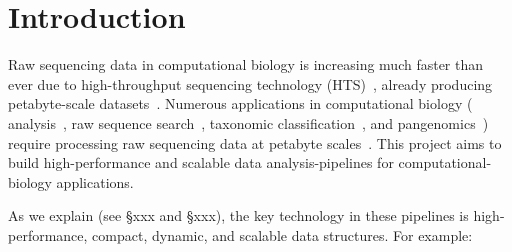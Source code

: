 

\section{Introduction}
\label{intro}





Raw sequencing data in computational biology is increasing much faster than ever
due to high-throughput sequencing technology (HTS)~\cite{cite-sequencing-technology}, already producing
petabyte-scale datasets~\cite{cite-petabyte-scale}. Numerous applications in computational biology (\kmer
analysis~\cite{cite-kmer-analysis}, raw sequence search~\cite{cite-raw-sequence}, taxonomic classification~\cite{cite-taxonomic-classification}, and pangenomics~\cite{cite-pangenomics})
require processing raw sequencing data at petabyte scales~\cite{cite-something-or-refer-to-figure-later-in-paper}. This project aims to
build high-performance and scalable data analysis-pipelines for computational-biology applications.

As we explain (see \S{xxx} and \S{xxx}), the key technology in these pipelines is high-performance, compact, dynamic, and scalable data structures. For example:


